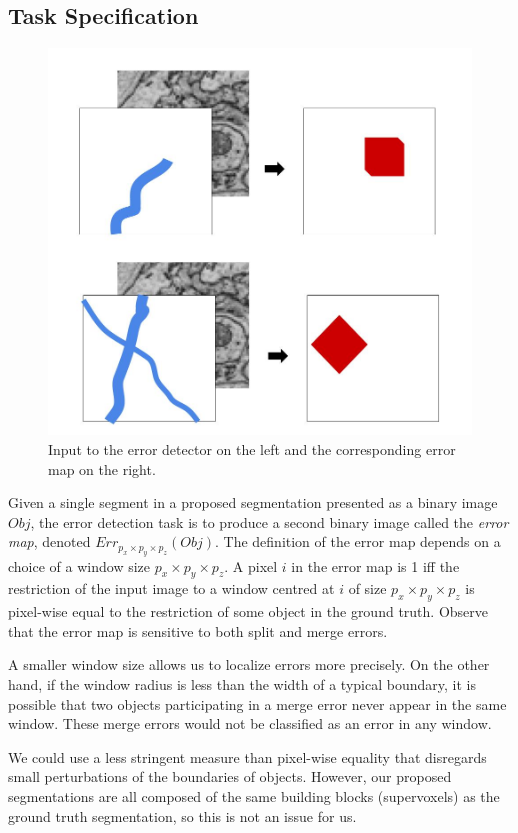 \documentclass{article}
\begin{document}
\subsection{Task Specification}
\begin{figure}
\begin{center}
	\includegraphics[width=0.65\linewidth]{detection_task.jpg}
	\caption{Input to the error detector on the left and the corresponding error map on the right.}
	\label{fig:error_detection_cartoon}
\end{center}
\end{figure}
Given a single segment in a proposed segmentation presented as a binary image $Obj$, the error detection task is to produce a second binary image called the \textit{error map}, denoted $Err_{p_x\times p_y \times p_z}(Obj)$. The definition of the error map depends on a choice of a window size $p_x \times p_y \times p_z$. A pixel $i$ in the error map is 1 iff the restriction of the input image to a window centred at $i$ of size $p_x \times p_y \times p_z$ is pixel-wise equal to the restriction of some object in the ground truth. Observe that the error map is sensitive to both split and merge errors.

A smaller window size allows us to localize errors more precisely. On the other hand, if the window radius is less than the width of a typical boundary, it is possible that two objects participating in a merge error never appear in the same window. These merge errors would not be classified as an error in any window. 

We could use a less stringent measure than pixel-wise equality that disregards small perturbations of the boundaries of objects. However, our proposed segmentations are all composed of the same building blocks (supervoxels) as the ground truth segmentation, so this is not an issue for us.
\end{document}

